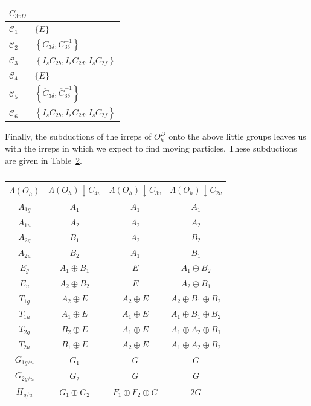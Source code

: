 \begin{table}
\begin{minipage}{0.32\linewidth}
            \begin{tabular}{l|l}
                $C_{3vD}$ & \\
                \hline
                $\mathcal{C}_{1}$ & $\{E\}$ \\
                $\mathcal{C}_{2}$ & $\left\{C_{3 \delta}, C_{3 \delta}^{-1}\right\}$ \\
                $\mathcal{C}_{3}$ & $\left\{I_{s} C_{2 b}, I_{s} C_{2 d}, I_{s} C_{2 f}\right\}$ \\
                $\mathcal{C}_{4}$ & $\{\overline{E}\}$ \\
                $\mathcal{C}_{5}$ & $\left\{\overline{C}_{3 \delta}, \overline{C}_{3 \delta}^{-1}\right\}$ \\
                $\mathcal{C}_{6}$ & $\left\{I_{s} \overline{C}_{2 b}, I_{s} \overline{C}_{2 d}, I_{s} \overline{C}_{2 f}\right\}$
            \end{tabular}
            \caption{}
            \label{table:c3vD}
        \end{minipage}
    \end{table}               
    Finally, the subductions of the irreps of $O_h^D$ onto the above little groups leaves us with the irreps in which we expect to find moving particles. These subductions are given in Table~\ref{table:subductions}.
    \begin{table}
        \centering
        \begin{tabular}{c|c|c|c}
            $\Lambda(O_h)$ & $\Lambda(O_h)\downarrow C_{4v}$ & $\Lambda(O_h) \downarrow C_
            {3v}$ & $\Lambda(O_h) \downarrow C_{2v}$ \\
            \hline
            $A_{1g}$ & $A_1$ & $A_1$ & $A_1$ \\
            $A_{1u}$ & $A_2$ & $A_2$ & $A_2$ \\
            $A_{2g}$ & $B_1$ & $A_2$ & $B_2$ \\
            $A_{2u}$ & $B_2$ & $A_1$ & $B_1$ \\
            $E_g$ & $A_1 \oplus B_1$ & $E$ & $A_1 \oplus B_2$ \\
            $E_u$ & $A_2 \oplus B_2$ & $E$ & $A_2 \oplus B_1$ \\
            $T_{1g}$ & $A_2 \oplus E$ & $A_2 \oplus E$ & $A_2 \oplus B_1 \oplus B_2$ \\
            $T_{1u}$ & $A_1 \oplus E$ & $A_1 \oplus E$ & $A_1 \oplus B_1 \oplus B_2$ \\
            $T_{2g}$ & $B_2 \oplus E$ & $A_1 \oplus E$ & $A_1 \oplus A_2 \oplus B_1$ \\
            $T_{2u}$ & $B_1 \oplus E$ & $A_2 \oplus E$ & $A_1 \oplus A_2 \oplus B_2$ \\
            $G_{1g/u}$ & $G_1$ & $G$ & $G$ \\
            $G_{2g/u}$ & $G_2$ & $G$ & $G$ \\
            $H_{g/u}$ & $G_1 \oplus G_2$ & $F_1 \oplus F_2 \oplus G$ & $2G$
        \end{tabular}
        \caption{}
        \label{table:subductions}
    \end{table}

